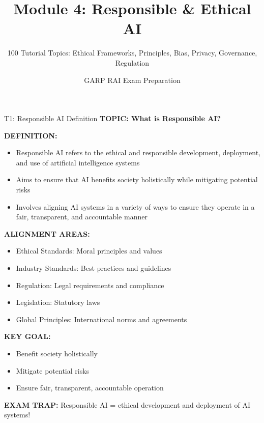 \documentclass[8pt]{beamer}
\title{Module 4: Responsible \& Ethical AI}
\subtitle{100 Tutorial Topics: Ethical Frameworks, Principles, Bias, Privacy, Governance, Regulation}
\author{GARP RAI Exam Preparation}
\date{}
\begin{document}
	
	\begin{frame}
		\titlepage
	\end{frame}
	
	
	\begin{frame}{T1: Responsible AI Definition}
		\fontsize{6.5}{7.5}\selectfont
		\textbf{TOPIC: What is Responsible AI?}
		
		\vspace{0.1cm}
		\textbf{DEFINITION:}
		\begin{itemize}
			\item Responsible AI refers to the ethical and responsible development, deployment, and use of artificial intelligence systems
			\item Aims to ensure that AI benefits society holistically while mitigating potential risks
			\item Involves aligning AI systems in a variety of ways to ensure they operate in a fair, transparent, and accountable manner
		\end{itemize}
		
		\vspace{0.1cm}
		\textbf{ALIGNMENT AREAS:}
		\begin{itemize}
			\item \textcolor{myblue}{Ethical Standards:} Moral principles and values
			\item \textcolor{myblue}{Industry Standards:} Best practices and guidelines
			\item \textcolor{myblue}{Regulation:} Legal requirements and compliance
			\item \textcolor{myblue}{Legislation:} Statutory laws
			\item \textcolor{myblue}{Global Principles:} International norms and agreements
		\end{itemize}
		
		\vspace{0.1cm}
		\textbf{KEY GOAL:}
		\begin{itemize}
			\item Benefit society holistically
			\item Mitigate potential risks
			\item Ensure fair, transparent, accountable operation
		\end{itemize}
		
		\textcolor{myred}{\textbf{EXAM TRAP:}} Responsible AI = \textcolor{myblue}{ethical development and deployment} of AI systems!
	\end{frame}
	
\end{document}
